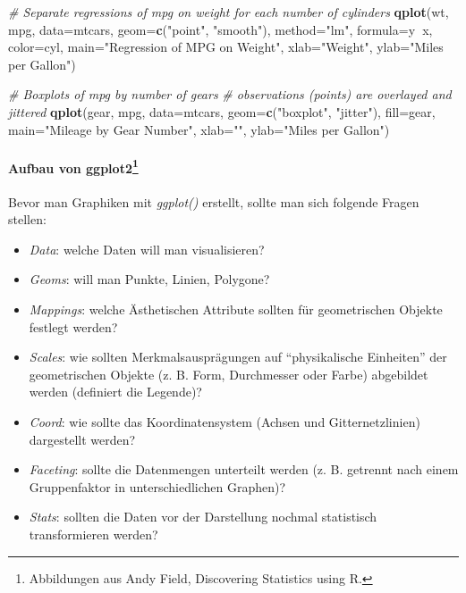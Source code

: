 \documentclass[]{article}
\newenvironment{Shaded}{\begin{snugshade}}{\end{snugshade}}
\newcommand{\KeywordTok}[1]{\textcolor[rgb]{0.13,0.29,0.53}{\textbf{#1}}}
\newcommand{\DataTypeTok}[1]{\textcolor[rgb]{0.13,0.29,0.53}{#1}}
\newcommand{\StringTok}[1]{\textcolor[rgb]{0.31,0.60,0.02}{#1}}
\newcommand{\CommentTok}[1]{\textcolor[rgb]{0.56,0.35,0.01}{\textit{#1}}}
\newcommand{\OperatorTok}[1]{\textcolor[rgb]{0.81,0.36,0.00}{\textbf{#1}}}
\newcommand{\NormalTok}[1]{#1}
\providecommand{\tightlist}{%
  \setlength{\itemsep}{0pt}\setlength{\parskip}{0pt}}
\let\oldparagraph\paragraph
\renewcommand{\paragraph}[1]{\oldparagraph{#1}\mbox{}}
\let\rmarkdownfootnote\footnote%
\def\footnote{\protect\rmarkdownfootnote}
\begin{document}
\begin{Shaded}
\begin{Highlighting}[]
  \CommentTok{# Separate regressions of mpg on weight for each number of cylinders}
  \KeywordTok{qplot}\NormalTok{(wt, mpg, }\DataTypeTok{data=}\NormalTok{mtcars, }\DataTypeTok{geom=}\KeywordTok{c}\NormalTok{(}\StringTok{"point"}\NormalTok{, }\StringTok{"smooth"}\NormalTok{),}
        \DataTypeTok{method=}\StringTok{"lm"}\NormalTok{, }\DataTypeTok{formula=}\NormalTok{y}\OperatorTok{~}\NormalTok{x, }\DataTypeTok{color=}\NormalTok{cyl,}
        \DataTypeTok{main=}\StringTok{"Regression of MPG on Weight"}\NormalTok{,}
        \DataTypeTok{xlab=}\StringTok{"Weight"}\NormalTok{, }\DataTypeTok{ylab=}\StringTok{"Miles per Gallon"}\NormalTok{)}
  
  \CommentTok{# Boxplots of mpg by number of gears}
  \CommentTok{# observations (points) are overlayed and jittered}
  \KeywordTok{qplot}\NormalTok{(gear, mpg, }\DataTypeTok{data=}\NormalTok{mtcars, }\DataTypeTok{geom=}\KeywordTok{c}\NormalTok{(}\StringTok{"boxplot"}\NormalTok{, }\StringTok{"jitter"}\NormalTok{),}
        \DataTypeTok{fill=}\NormalTok{gear, }\DataTypeTok{main=}\StringTok{"Mileage by Gear Number"}\NormalTok{,}
        \DataTypeTok{xlab=}\StringTok{""}\NormalTok{, }\DataTypeTok{ylab=}\StringTok{"Miles per Gallon"}\NormalTok{)   }
\end{Highlighting}
\end{Shaded}

\paragraph{\texorpdfstring{Aufbau von ggplot2\footnote{Abbildungen aus
  Andy Field, Discovering Statistics using R.}}{Aufbau von ggplot2}}\label{aufbau-von-ggplot213}

Bevor man Graphiken mit \emph{ggplot()} erstellt, sollte man sich
folgende Fragen stellen:

\begin{itemize}
\tightlist
\item
  \emph{Data}: welche Daten will man visualisieren?
\item
  \emph{Geoms}: will man Punkte, Linien, Polygone?
\item
  \emph{Mappings}: welche Ästhetischen Attribute sollten für
  geometrischen Objekte festlegt werden?
\item
  \emph{Scales}: wie sollten Merkmalsausprägungen auf ``physikalische
  Einheiten'' der geometrischen Objekte (z. B. Form, Durchmesser oder
  Farbe) abgebildet werden (definiert die Legende)?
\item
  \emph{Coord}: wie sollte das Koordinatensystem (Achsen und
  Gitternetzlinien) dargestellt werden?
\item
  \emph{Faceting}: sollte die Datenmengen unterteilt werden (z. B.
  getrennt nach einem Gruppenfaktor in unterschiedlichen Graphen)?
\item
  \emph{Stats}: sollten die Daten vor der Darstellung nochmal
  statistisch transformieren werden?
\end{itemize}
\end{document}
